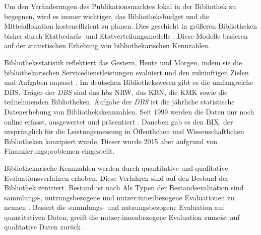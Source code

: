 Um den Veränderungen des Publikationsmarktes lokal in der Bibliothek zu begegnen, wird es immer wichtiger, das Bibliotheksbudget und die Mittelallokation kosteneffizient zu planen. 
Dies geschieht in größeren Bibliotheken bisher durch Etatbedarfs- und Etatverteilungsmodelle \cite[vgl.][172 ff.]{moravetz-kuhlmann_monika_erwerbungspolitik_2015}.
Diese Modelle basieren auf der statistischen Erhebung von bibliothekarischen Kennzahlen.

Bibliotheksstatistik reflektiert das Gestern, Heute und Morgen, indem 
sie die bibliothekarischen Servicedienstleistungen evaluiert und den zukünftigen Zielen und Aufgaben anpasst \cites[vgl.][2 f.]{jilovsky_cathie_library_2004}[vgl.][462]{laitinen_markku_library_2013}.
Im deutschen Bibliothekswesen gibt es die umfangreiche \acrfull{DBS}. 
Träger der \textit{\acrshort{DBS}} sind das \acrfull{hbz NRW},  das \acrfull{KBN}, die \acrfull{KMK} sowie die teilnehmenden Bibliotheken.
Aufgabe der \textit{\acrshort{DBS}} ist die jährliche statistische Datenerhebung von Bibliothekskennzahlen. 
Seit 1999 werden die Daten nur noch online erfasst, ausgewertet und präsentiert \cite[vgl.][2]{schmidt_deutsche_2008}.
Daneben gab es den \acrfull{BIX}, der ursprünglich für die Leistungsmessung in Öffentlichen und Wissenschaftlichen Bibliotheken konzipiert wurde. 
Dieser wurde 2015 aber aufgrund von Finanzierungsproblemen eingestellt. 

Bibliothekarische Kennzahlen werden durch quantitative und qualitative Evaluationsverfahren erhoben. Diese Verfahren
sind auf den Bestand der Bibliothek zentriert. 
Bestand ist nach \citeauthor{johannsen_jochen_bestands-_2015}
 \cite[252]{johannsen_jochen_bestands-_2015}
Als Typen der Bestandsevaluation sind sammlungs-, nutzungsbezogene und nutzer:innenbezogene Evaluationen zu nennen \cite[vgl.][302]{johnson_peggy_fundamentals_2014}.
Basiert die sammlungs- und nutzungsbezogene Evaluation auf quantitativen Daten, greift die nutzer:innenbezogene Evaluation zumeist auf qualitative Daten zurück \cite[vgl.][461 ff.]{blake_data_2004}.

